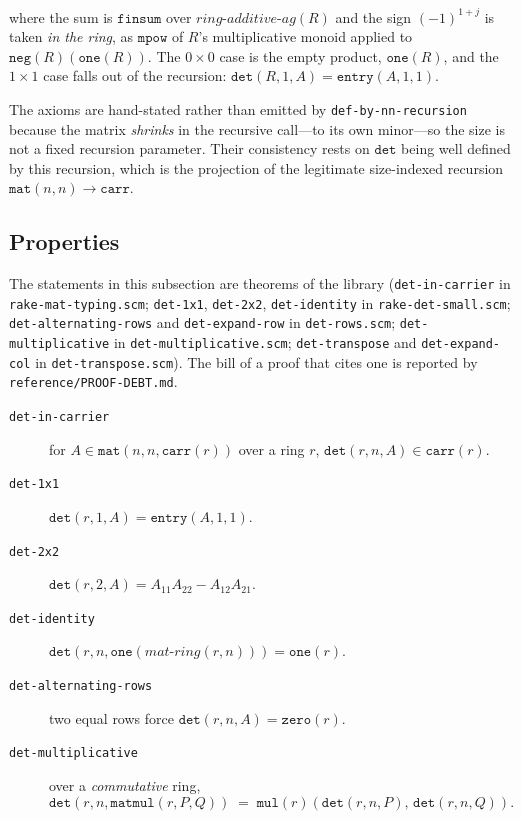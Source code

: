 \noindent
where the sum is $\mathtt{finsum}$ over $\mathit{ring\text{-}additive\text{-}ag}(R)$
and the sign $(-1)^{1+j}$ is taken \emph{in the ring}, as
$\mathtt{mpow}$ of $R$'s multiplicative monoid applied to
$\mathtt{neg}(R)(\mathtt{one}(R))$.  The $0 \times 0$ case is the empty
product, $\mathtt{one}(R)$, and the $1 \times 1$ case falls out of the
recursion: $\mathtt{det}(R,1,A) = \mathtt{entry}(A,1,1)$.

The axioms are hand-stated rather than emitted by
\texttt{def-by-nn-recursion} because the matrix \emph{shrinks} in the
recursive call---to its own minor---so the size is not a fixed recursion
parameter.  Their consistency rests on $\mathtt{det}$ being well defined
by this recursion, which is the projection of the legitimate
size-indexed recursion $\mathtt{mat}(n,n) \to \mathtt{carr}$.

\subsection{Properties}

\begin{remark}
The statements in this subsection are theorems of the library
(\texttt{det-in-carrier} in \texttt{rake-mat-typing.scm}; \texttt{det-1x1},
\texttt{det-2x2}, \texttt{det-identity} in \texttt{rake-det-small.scm};
\texttt{det-alternating-rows} and \texttt{det-expand-row} in \texttt{det-rows.scm};
\texttt{det-multiplicative} in \texttt{det-multiplicative.scm};
\texttt{det-transpose} and \texttt{det-expand-col} in \texttt{det-transpose.scm}).
The bill of a proof that cites one is reported by \texttt{reference/PROOF-DEBT.md}.
\end{remark}

\begin{description}
\item[\texttt{det-in-carrier}]
  for $A \in \mathtt{mat}(n,n,\mathtt{carr}(r))$ over a ring $r$,
  $\mathtt{det}(r,n,A) \in \mathtt{carr}(r)$.

\item[\texttt{det-1x1}]
  $\mathtt{det}(r,1,A) = \mathtt{entry}(A,1,1)$.

\item[\texttt{det-2x2}]
  $\mathtt{det}(r,2,A) = A_{11}A_{22} - A_{12}A_{21}$.

\item[\texttt{det-identity}]
  $\mathtt{det}(r, n, \mathtt{one}(\mathit{mat\text{-}ring}(r,n)))
   = \mathtt{one}(r)$.

\item[\texttt{det-alternating-rows}]
  two equal rows force $\mathtt{det}(r,n,A) = \mathtt{zero}(r)$.

\item[\texttt{det-multiplicative}]
  over a \emph{commutative} ring,
  \[
    \mathtt{det}(r,n,\mathtt{matmul}(r,P,Q)) \;=\;
    \mathtt{mul}(r)(\mathtt{det}(r,n,P),\, \mathtt{det}(r,n,Q)).
  \]
\end{description}

